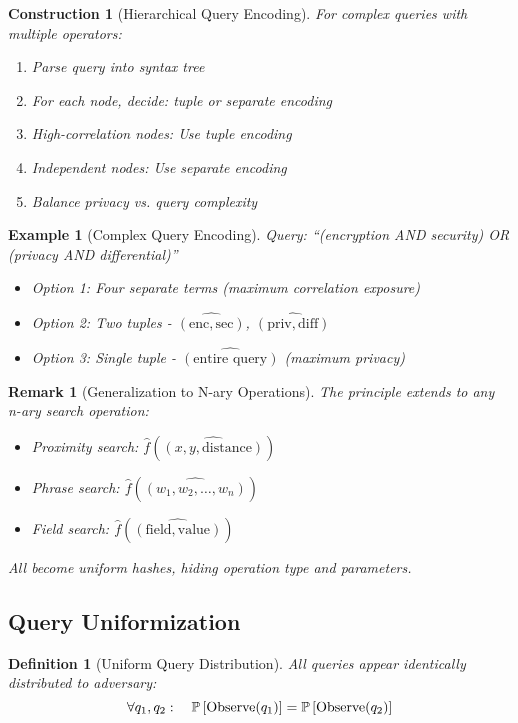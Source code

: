 \documentclass[11pt,final,hidelinks]{article}
\newtheorem{definition}[theorem]{Definition}
\newtheorem{example}[theorem]{Example}
\newtheorem{remark}[theorem]{Remark}
\newtheorem{construction}[theorem]{Construction}
\begin{document}
\begin{construction}[Hierarchical Query Encoding]
For complex queries with multiple operators:
\begin{enumerate}
    \item Parse query into syntax tree
    \item For each node, decide: tuple or separate encoding
    \item High-correlation nodes: Use tuple encoding
    \item Independent nodes: Use separate encoding
    \item Balance privacy vs. query complexity
\end{enumerate}
\end{construction}

\begin{example}[Complex Query Encoding]
Query: ``(encryption AND security) OR (privacy AND differential)''
\begin{itemize}
    \item Option 1: Four separate terms (maximum correlation exposure)
    \item Option 2: Two tuples - $\widehat{(\text{enc}, \text{sec})}$, $\widehat{(\text{priv}, \text{diff})}$
    \item Option 3: Single tuple - $\widehat{(\text{entire query})}$ (maximum privacy)
\end{itemize}
\end{example}

\begin{remark}[Generalization to N-ary Operations]
The principle extends to any n-ary search operation:
\begin{itemize}
    \item Proximity search: $\hat{f}(\widehat{(x, y, \text{distance})})$
    \item Phrase search: $\hat{f}(\widehat{(w_1, w_2, \ldots, w_n)})$
    \item Field search: $\hat{f}(\widehat{(\text{field}, \text{value})})$
\end{itemize}
All become uniform hashes, hiding operation type and parameters.
\end{remark}

\subsection{Query Uniformization}

\begin{definition}[Uniform Query Distribution]
All queries appear identically distributed to adversary:
\begin{equation}
\forall q_1, q_2: \quad \mathbb{P}\left[\text{Observe}(q_1)\right] = \mathbb{P}\left[\text{Observe}(q_2)\right]
\end{equation}
\end{definition}
\end{document}
